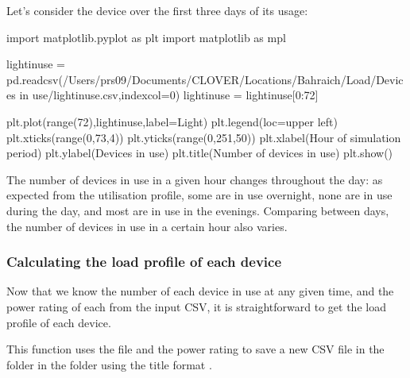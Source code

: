 \documentclass[letterpaper,10pt,english]{sphinxmanual}
\begin{document}
\sphinxAtStartPar
Let’s consider the  device over the first three days of its
usage:

\begin{sphinxVerbatim}[commandchars=\\\{\}]
import matplotlib.pyplot as plt
import matplotlib as mpl

light\PYGZus{}in\PYGZus{}use = pd.read\PYGZus{}csv(\PYGZdq{}/Users/prs09/Documents/CLOVER/Locations/Bahraich/Load/Devices in use/light\PYGZus{}in\PYGZus{}use.csv\PYGZdq{},index\PYGZus{}col=0)
light\PYGZus{}in\PYGZus{}use = light\PYGZus{}in\PYGZus{}use[0:72]

plt.plot(range(72),light\PYGZus{}in\PYGZus{}use,label=\PYGZsq{}Light\PYGZsq{})
plt.legend(loc=\PYGZsq{}upper left\PYGZsq{})
plt.xticks(range(0,73,4))
plt.yticks(range(0,251,50))
plt.xlabel(\PYGZsq{}Hour of simulation period\PYGZsq{})
plt.ylabel(\PYGZsq{}Devices in use\PYGZsq{})
plt.title(\PYGZsq{}Number of devices in use\PYGZsq{})
plt.show()
\end{sphinxVerbatim}

\noindent{}

\sphinxAtStartPar
The number of  devices in use in a given hour changes
throughout the day: as expected from the utilisation profile, some are
in use overnight, none are in use during the day, and most are in use in
the evenings. Comparing between days, the number of devices in use in a
certain hour also varies.


\subsubsection{Calculating the load profile of each device}
\label{\detokenize{load:calculating-the-load-profile-of-each-device}}
\sphinxAtStartPar
Now that we know the number of each device in use at any given time, and
the power rating of each from the  input CSV, it is
straightforward to get the load profile of each device. 

\begin{sphinxVerbatim}[commandchars=\\\{\}]
\end{sphinxVerbatim}

\sphinxAtStartPar
This function uses the  file and the power rating
to save a new CSV file in the  folder in the  folder
using the title format .
\end{document}
